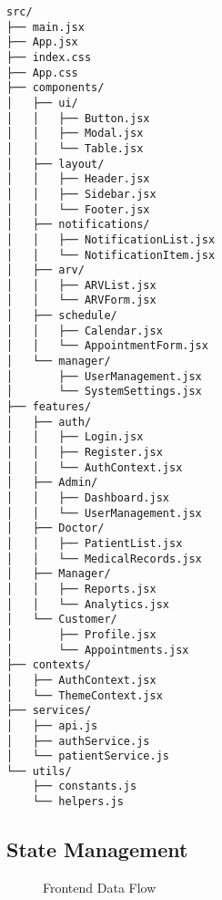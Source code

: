 \documentclass[12pt,a4paper]{article}
\begin{document}
\begin{lstlisting}[language=text, caption=Frontend Component Structure]
src/
├── main.jsx
├── App.jsx
├── index.css
├── App.css
├── components/
│   ├── ui/
│   │   ├── Button.jsx
│   │   ├── Modal.jsx
│   │   └── Table.jsx
│   ├── layout/
│   │   ├── Header.jsx
│   │   ├── Sidebar.jsx
│   │   └── Footer.jsx
│   ├── notifications/
│   │   ├── NotificationList.jsx
│   │   └── NotificationItem.jsx
│   ├── arv/
│   │   ├── ARVList.jsx
│   │   └── ARVForm.jsx
│   ├── schedule/
│   │   ├── Calendar.jsx
│   │   └── AppointmentForm.jsx
│   └── manager/
│       ├── UserManagement.jsx
│       └── SystemSettings.jsx
├── features/
│   ├── auth/
│   │   ├── Login.jsx
│   │   ├── Register.jsx
│   │   └── AuthContext.jsx
│   ├── Admin/
│   │   ├── Dashboard.jsx
│   │   └── UserManagement.jsx
│   ├── Doctor/
│   │   ├── PatientList.jsx
│   │   └── MedicalRecords.jsx
│   ├── Manager/
│   │   ├── Reports.jsx
│   │   └── Analytics.jsx
│   └── Customer/
│       ├── Profile.jsx
│       └── Appointments.jsx
├── contexts/
│   ├── AuthContext.jsx
│   └── ThemeContext.jsx
├── services/
│   ├── api.js
│   ├── authService.js
│   └── patientService.js
└── utils/
    ├── constants.js
    └── helpers.js
\end{lstlisting}

\subsection{State Management}

\begin{figure}[H]
\centering
{}
\caption{Frontend Data Flow}
\label{fig:data-flow}
\end{figure}
\end{document}
